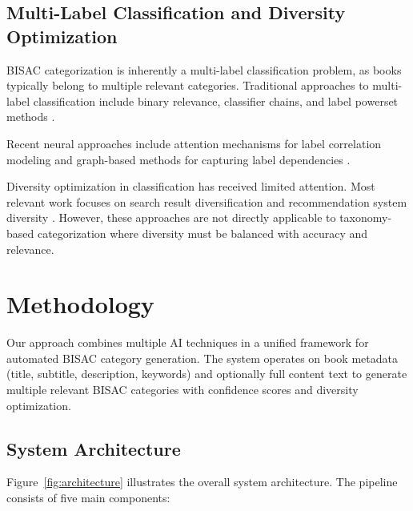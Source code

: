 \documentclass{article}
\begin{document}
\subsection{Multi-Label Classification and Diversity Optimization}

BISAC categorization is inherently a multi-label classification problem, as books typically belong to multiple relevant categories. Traditional approaches to multi-label classification include binary relevance, classifier chains, and label powerset methods \cite{tsoumakas2007multi}.

Recent neural approaches include attention mechanisms for label correlation modeling \cite{wang2016attention} and graph-based methods for capturing label dependencies \cite{chen2019multi}.

Diversity optimization in classification has received limited attention. Most relevant work focuses on search result diversification \cite{santos2010exploiting} and recommendation system diversity \cite{ziegler2005improving}. However, these approaches are not directly applicable to taxonomy-based categorization where diversity must be balanced with accuracy and relevance.

\section{Methodology}
\label{sec:methodology}

Our approach combines multiple AI techniques in a unified framework for automated BISAC category generation. The system operates on book metadata (title, subtitle, description, keywords) and optionally full content text to generate multiple relevant BISAC categories with confidence scores and diversity optimization.

\subsection{System Architecture}

Figure~\ref{fig:architecture} illustrates the overall system architecture. The pipeline consists of five main components:
\end{document}
